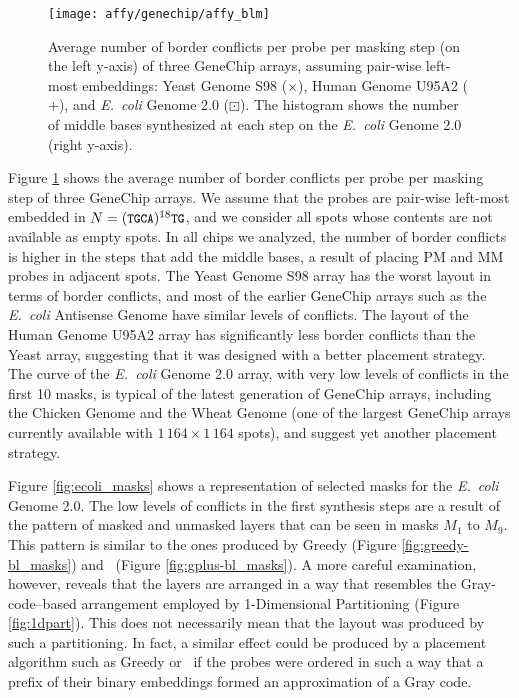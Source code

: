 \begin{figure}[t]\centering
\texttt{[image: affy/genechip/affy\_blm]}
\caption{\label{fig:affy_blm}%
  Average number of border conflicts per probe per masking step (on the left
  y-axis) of three GeneChip arrays, assuming pair-wise left-most embeddings:
  Yeast Genome S98 ({\scriptsize $\times$}), Human Genome U95A2 ({\tiny $+$}),
  and \emph{E.\ coli} Genome 2.0 ({\tiny $\boxdot$}). The histogram shows the
  number of middle bases synthesized at each step on the \emph{E.\ coli} Genome
  2.0 (right y-axis).}
\end{figure}

Figure \ref{fig:affy_blm} shows the average number of border conflicts per probe
per masking step of three GeneChip arrays. We assume that the probes are
pair-wise left-most embedded in $N=({\text{\small{\tt{TGCA}}}})^{18}{\text{\small{\tt{TG}}}}$, and we consider
all spots whose contents are not available as empty spots. In all chips we
analyzed, the number of border conflicts is higher in the steps that add the
middle bases, a result of placing PM and MM probes in adjacent spots. The Yeast
Genome S98 array has the worst layout in terms of border conflicts, and most of
the earlier GeneChip arrays such as the \emph{E.\ coli} Antisense Genome have similar
levels of conflicts. The layout of the Human Genome U95A2 array has significantly
less border conflicts than the Yeast array, suggesting that it was designed with
a better placement strategy. The curve of the \emph{E.\ coli} Genome 2.0 array, with
very low levels of conflicts in the first 10 masks, is typical of the latest
generation of GeneChip arrays, including the Chicken Genome and the Wheat Genome
(one of the largest GeneChip arrays currently available with
$1\,164\times 1\,164$ spots), and suggest yet another placement strategy.

Figure \ref{fig:ecoli_masks} shows a representation of selected masks for the
\emph{E.\ coli} Genome 2.0. The low levels of conflicts in the first synthesis steps
are a result of the pattern of masked and unmasked layers that can be seen in
masks $M_1$ to $M_9$. This pattern is similar to the ones produced by Greedy
(Figure \ref{fig:greedy-bl_masks}) and \Greedyplus\ (Figure
\ref{fig:gplus-bl_masks}). A more careful examination, however, reveals that the
layers are arranged in a way that resembles the Gray-code--based arrangement
employed by 1-Dimensional Partitioning (Figure \ref{fig:1dpart}). This does not
necessarily mean that the layout was produced by such a partitioning. In fact, a
similar effect could be produced by a placement algorithm such as Greedy or
\Greedyplus\ if the probes were ordered in such a way that a prefix of their
binary embeddings formed an approximation of a Gray code.

